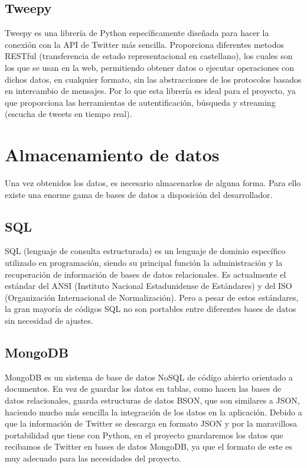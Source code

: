 \subsection{Tweepy\cite{Tweepy}}

Tweepy es una librería de Python específicamente diseñada para hacer la conexión con la API de Twitter más sencilla. Proporciona diferentes metodos RESTful (transferencia de estado representacional en castellano), los cuales son los que se usan en la web, permitiendo obtener datos o ejecutar operaciones con dichos datos, en cualquier formato, sin las abstracciones de los protocolos basados en intercambio de mensajes. Por lo que esta librería es ideal para el proyecto, ya que proporciona las herramientas de autentificación, búsqueda y streaming (escucha de tweets en tiempo real).

\section{Almacenamiento de datos}
Una vez obtenidos los datos, es necesario almacenarlos de alguna forma. Para ello existe una enorme gama de bases de datos a disposición del desarrollador. 

\subsection{SQL}

SQL (lenguaje de consulta estructurada) es un lenguaje de dominio específico utilizado en programación, siendo su principal función la administración y la recuperación de información de bases de datos relacionales. Es actualmente el estándar del ANSI (Instituto Nacional Estadunidense de Estándares) y del ISO (Organización Internacional de Normalización). Pero a pesar de estos estándares, la gran mayoría de códigos SQL no son portables entre diferentes bases de datos sin necesidad de ajustes. 

\subsection{MongoDB\cite{MongoDB}}

MongoDB es un sistema de base de datos NoSQL de código abierto orientado a documentos. En vez de guardar los datos en tablas, como hacen las bases de datos relacionales, guarda estructuras de datos BSON, que son similares a JSON, haciendo mucho más sencilla la integración de los datos en la aplicación. Debido a que la información de Twitter se descarga en formato JSON y por la maravillosa portabilidad que tiene con Python, en el proyecto guardaremos los datos que recibamos de Twitter en bases de datos MongoDB, ya que el formato de este es muy adecuado para las necesidades del proyecto. 


